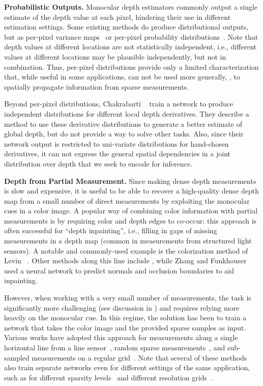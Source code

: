 \documentclass[10pt,twocolumn,letterpaper]{article}
\begin{document}
\noindent\textbf{Probabilistic Outputs.} Monocular depth estimators commonly output a single estimate of the depth value at each pixel, hindering their use in different estimation settings. Some existing methods do produce distributional outputs, but as per-pixel variance maps~\cite{kendall2017uncertainties,heo2018monocular} or per-pixel probability distributions~\cite{liu2019neural}. Note that depth values at different locations are not statistically independent, i.e., different values at different locations may be plausible independently, but not in combination. Thus, per-pixel distributions provide only a limited characterization that, while useful in some applications, can not be used more generally, \eg, to spatially propagate information from sparse measurements. 

Beyond per-pixel distributions, Chakrabarti \etal~\cite{chakrabarti2016depth} train a network to produce independent distributions for different local depth derivatives. They describe a method to use these derivative distributions to generate a better estimate of global depth, but do not provide a way to solve other tasks. Also, since their network output is restricted to uni-variate distributions for hand-chosen derivatives, it can not express the general spatial dependencies in a joint distribution over depth that we seek to encode for inference.

\noindent\textbf{Depth from Partial Measurement.} Since making dense depth measurements is slow and expensive, it is useful to be able to recover a high-quality dense depth map from a small number of direct measurements by exploiting the monocular cues in a color image. A popular way of combining color information with partial measurements is by requiring color and depth edges to co-occur: this approach is often successful for ``depth inpainting'', i.e., filling in gaps of missing measurements in a depth map (common in measurements from structured light sensors). A notable and commonly-used example is the colorization method of Levin \etal~\cite{levin2004colorization}. Other methods along this line include \cite{herrera2013depth,liu2012guided,liu2013guided,Matsuo_2015_CVPR,doria2012filling}, while Zhang and Funkhouser~\cite{zhang2018deep} used a neural network to predict normals and occlusion boundaries to aid inpainting.

However, when working with a very small number of measurements, the task is significantly more challenging (see discussion in \cite{chen2018estimating}) and requires relying more heavily on the monocular cue. In this regime, the solution has been to train a network that takes the color image and the provided sparse samples as input. Various works have adopted this approach for measurements along a single horizontal line from a line sensor~\cite{liao2017sparse}, random sparse measurements~\cite{van2019sparse,ma2018sparse,jaritz2018sparse,shivakumar2019dfusenet}, and sub-sampled measurements on a regular grid~\cite{li2016deep,gu2017learning,chen2018estimating}. Note that several of these methods also train separate networks even for different settings of the same application, such as for different sparsity levels~\cite{ma2018sparse} and different resolution grids~\cite{chen2018estimating}.
\end{document}
